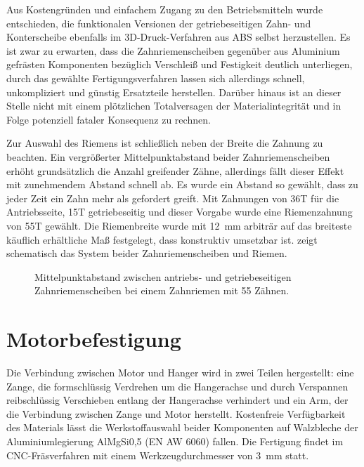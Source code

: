		Aus Kostengründen und einfachem Zugang zu den Betriebsmitteln wurde entschieden, die funktionalen Versionen der getriebeseitigen Zahn- und Konterscheibe ebenfalls im 3D-Druck-Verfahren aus ABS selbst herzustellen.
		Es ist zwar zu erwarten, dass die Zahnriemenscheiben gegenüber aus Aluminium gefrästen Komponenten bezüglich Verschleiß und Festigkeit deutlich unterliegen, durch das gewählte Fertigungsverfahren lassen sich allerdings schnell, unkompliziert und günstig Ersatzteile herstellen.
		Darüber hinaus ist an dieser Stelle nicht mit einem plötzlichen Totalversagen der Materialintegrität und in Folge potenziell fataler Konsequenz zu rechnen.\par\medskip
		Zur Auswahl des Riemens ist schließlich neben der Breite die Zahnung zu beachten.
		Ein vergrößerter Mittelpunktabstand beider Zahnriemenscheiben erhöht grundsätzlich die Anzahl greifender Zähne, allerdings fällt dieser Effekt mit zunehmendem Abstand schnell ab.
		Es wurde ein Abstand so gewählt, dass zu jeder Zeit ein Zahn mehr als gefordert greift.
		Mit Zahnungen von 36T für die Antriebsseite, 15T getriebeseitig und dieser Vorgabe wurde eine Riemenzahnung von 55T gewählt.
		Die Riemenbreite wurde mit \qty{12}{\milli\metre} arbiträr auf das breiteste käuflich erhältliche Maß festgelegt, dass konstruktiv umsetzbar ist.
		 zeigt schematisch das System beider Zahnriemenscheiben und Riemen.
		\begin{figure}[h]
			\centering
			
			\caption[Mittelpunktabstand zwischen antriebs- und getriebeseitigen Zahnriemenscheiben]{Mittelpunktabstand zwischen antriebs- und getriebeseitigen Zahnriemenscheiben bei einem Zahnriemen mit 55 Zähnen.}%
			\label{fig:timing belt length}
		\end{figure}
	\section{Motorbefestigung}\label{sec:motorbefestigung}
		Die Verbindung zwischen Motor und Hanger wird in zwei Teilen hergestellt: eine Zange, die formschlüssig Verdrehen um die Hangerachse und durch Verspannen reibschlüssig Verschieben entlang der Hangerachse verhindert und ein Arm, der die Verbindung zwischen Zange und Motor herstellt.
		Kostenfreie Verfügbarkeit des Materials lässt die Werkstoffauswahl beider Komponenten auf Walzbleche der Aluminiumlegierung AlMgSi0,5 (EN AW 6060) fallen.
		Die Fertigung findet im CNC-Fräsverfahren mit einem Werkzeugdurchmesser von \qty{3}{\milli\metre} statt.

